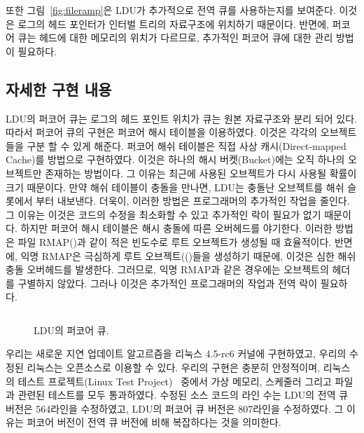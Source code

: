 또한 그림~\ref{fig:fileramp}은 LDU가 추가적으로 전역 큐를 사용하는지를 보여준다. 
이것은 로그의 헤드 포인터가 인터벌 트리의 자료구조에 위치하기 때문이다.
반면에, 퍼코어 큐는 헤드에 대한 메모리의 위치가 다르므로, 추가적인 퍼코어 큐에 대한 관리 방법이 필요하다. 

\subsection{자세한 구현 내용}
LDU의 퍼코어 큐는 로그의 헤드 포인트 위치가 큐는 원본 자료구조와 분리 되어 있다.
따라서 퍼코어 큐의 구현은 퍼코어 해시 테이블을 이용하였다. 
이것은 각각의 오브젝트들을 구분 할 수 있게 해준다.
퍼코어 해쉬 테이블은 직접 사상 캐시(Direct-mapped Cache)를 방법으로 구현하였다. 
이것은 하나의 해시 버켓(Bucket)에는 오직 하나의 오브젝트만 존재하는 방법이다.
그 이유는 최근에 사용된 오브젝트가 다시 사용될 확률이 크기 때문이다. 
만약 해쉬 테이블이 충돌을 만나면, LDU는 충돌난 오브젝트를 해쉬 슬롯에서 부터 내보낸다.
더욱이, 이러한 방법은 프로그래머의 추가적인 작업을 줄인다. 
그 이유는 이것은 코드의 수정을 최소화할 수 있고 추가적인 락이 필요가 없기 때문이다.
하지만 퍼코어 해시 테이블은 해시 충돌에 따른 오버헤드를 야기한다.
이러한 방법은 파일 RMAP()과 같이 적은 빈도수로 루트 
오브젝트가 생성될 때 효율적이다. 
반면에, 익명 RMAP은 극심하게 루트 오브젝트(()들을 생성하기 때문에, 
이것은 심한 해쉬 충돌 오버헤드를 발생한다. 
그러므로, 익명 RMAP과 같은 경우에는 오브젝트의 헤더를 구별하지 않았다. 
그러나 이것은 추가적인 프로그래머의 작업과 전역 락이 필요하다.

\begin{figure}[h!]
\begin{center}
\inputminted[linenos,fontsize=\footnotesize,
tabsize=4]{c}{src/ldu_queue_per_core.c}
\end{center}
\caption{LDU의 퍼코어 큐.}
\label{fig:glduphysicalupdate}
\end{figure}

우리는 새로운 지연 업데이트 알고르즘을 리눅스 4.5-rc6 커널에 구현하였고, 우리의 
수정된 리눅스는 오픈소스로 이용할 수 있다.  
우리의 구현은 충분히 안정적이며, 리눅스의 테스트 
프로젝트(Linux Test Project)~\cite{LTP} 중에서 가상 메모리, 스케줄러 그리고 
파일과 관련된 테스트를 모두 통과하였다. 
수정된 소스 코드의 라인 수는 LDU의 전역 큐 버전은 564라인을 수정하였고, 
LDU의 퍼코어 큐 버전은 807라인을 수정하였다. 
그 이유는 퍼코어 버전이 전역 큐 버전에 비해 복잡하다는 것을 의미한다.



